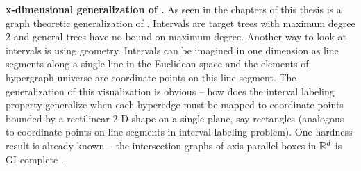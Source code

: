 
 
\textbf{x-dimensional generalization of \COP.} As seen in the chapters
of this thesis \TPL is a graph theoretic generalization of
\COP. Intervals are target trees with maximum degree 2 and general
trees have no bound on maximum degree. Another way to look at
intervals is using geometry. Intervals can be imagined in one
dimension as line segments along a single line in the Euclidean space
and the elements of hypergraph universe are coordinate points on this
line segment. The generalization of this visualization is obvious --
how does the interval labeling property generalize when each hyperedge
must be mapped to coordinate points bounded by a rectilinear 2-D shape
on a single plane, say rectangles (analogous to coordinate points on
line segments in interval labeling problem). One hardness result is
already known -- the intersection graphs of axis-parallel boxes in
$\mathbb R^d$ is GI-complete \cite{ueh08}.